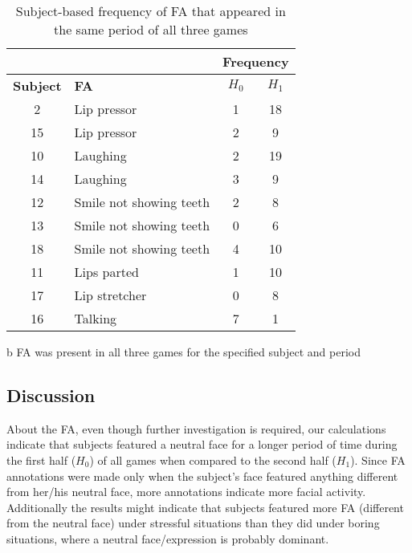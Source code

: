 \begin{table}[!t]
\renewcommand{\arraystretch}{1.3}
\caption{Subject-based frequency of FA that appeared in the same period of all three games}
\label{table:individual}
\centering
\begin{threeparttable}
\begin{tabular}{|c|p{4.8cm}|c|c|}
\cline{3-4}
\multicolumn{2}{c|}{} & \multicolumn{2}{|c|}{\textbf{Frequency}} \\
\hline
\textbf{Subject} & \textbf{FA} & \textbf{$H_0$} & \textbf{$H_1$} \\
\hline
2 & Lip pressor & 1 & 18\tnote{b} \\
\hline
15 & Lip pressor & 2 & 9\tnote{b} \\
\hline
10 & Laughing & 2 & 19\tnote{b} \\
\hline
14 & Laughing & 3 & 9\tnote{b} \\
\hline
12 & Smile not showing teeth & 2 & 8\tnote{b} \\
\hline
13 & Smile not showing teeth & 0 & 6\tnote{b} \\
\hline
18 & Smile not showing teeth & 4 & 10\tnote{b} \\
\hline
11 & Lips parted & 1 & 10\tnote{b} \\
\hline
17 & Lip stretcher & 0 & 8\tnote{b} \\
\hline
16 & Talking & 7\tnote{b} & 1 \\
\hline
\end{tabular}
\begin{tablenotes}
\small
\item[b]{FA was present in all three games for the specified subject and period}
\end{tablenotes}
\end{threeparttable}
\end{table}

\subsection{Discussion}

About the FA, even though further investigation is required, our calculations indicate that subjects featured a neutral face for a longer period of time during the first half ($H_0$) of all games when compared to the second half ($H_1$). Since FA annotations were made only when the subject's face featured anything different from her/his neutral face, more annotations indicate more facial activity. Additionally the results might indicate that subjects featured more FA (different from the neutral face) under stressful situations than they did under boring situations, where a neutral face/expression is probably dominant.

